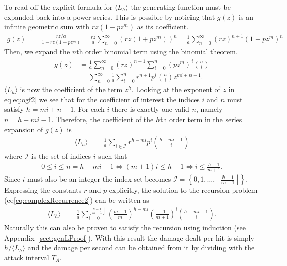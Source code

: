 To read off the explicit formula for $\langle L_h \rangle$ the generating function must be expanded back into a power series. This is possible by noticing that $g(z)$ is an infinite geometric sum with $rz(1 - pz^m)$ as its coefficient.
\begin{align}
    g(z) &= \frac{rz/a}{1 - rz\left(1 + pz^{m}\right)}\nonumber
    = \frac{rz}{a} \sum_{n=0}^\infty {(rz(1 + pz^m))}^n\nonumber
    = \frac{1}{a} \sum_{n=0}^\infty {(rz)}^{n+1}{(1 + pz^m)}^n
\end{align}
Then, we expand the $n$th order binomial term using the binomial theorem.
\begin{align}
    g(z) &= \frac{1}{a} \sum_{n=0}^\infty {(rz)}^{n+1}\sum_{i=0}^{n} {(pz^m)}^i {n \choose i}\nonumber\\
         &= \sum_{n=0}^\infty \frac{1}{a}\sum_{i=0}^{n} r^{n+1} p^i {n \choose i}z^{mi+n+1}\label{eq:ogf2}.
\end{align}
$\langle L_h \rangle$ is now the coefficient of the term $z^h$. Looking at the exponent of $z$ in eq\ref{eq:ogf2} we see that for the coefficient of interest the indices $i$ and $n$ must satisfy $h=mi+n+1$. For each $i$ there is exactly one valid $n$, namely $n = h-mi-1$.
Therefore, the coefficient of the $h$th order term in the series expansion of $g(z)$ is
\begin{align}
    \langle L_h \rangle &= \frac{1}{a}\sum_{i \in \mathcal{I}} r^{h-mi} p^i {h-mi-1 \choose i} \nonumber
\end{align}
where $\mathcal{I}$ is the set of indices $i$ such that
\begin{align*}
    0 \leq i \leq n = h-mi-1
    \iff (m+1)i \leq h-1
    \iff i \leq \frac{h-1}{m+1}.
\end{align*}
Since $i$ must also be an integer the index set becomes $\mathcal{I} = \left\{0,1,\ldots,\left\lfloor{\frac{h-1}{m+1}}\right\rfloor\right\}$. Expressing the constants $r$ and $p$ explicitly, the solution to the recursion problem (eq\ref{eq:complexRecurrence2}) can be written as
\begin{align}
    \langle L_h \rangle &= \frac{1}{a}\sum_{i=0}^{\left\lfloor{\frac{h-1}{m+1}}\right\rfloor} {\left(\frac{m+1}{m}\right)}^{h-mi} {\left(\frac{-1}{m+1}\right)}^i {h-mi-1 \choose i}.\label{eq:explicitL}
\end{align}
Naturally this can also be proven to satisfy the recursion using induction (see Appendix~\ref{sect:genLProof}). With this result the damage dealt per hit is simply $h/\langle L_h \rangle$ and the damage per second can be obtained from it by dividing with the attack interval $T_A$.
